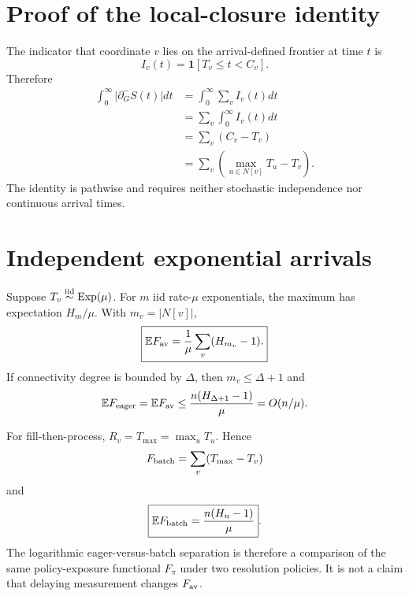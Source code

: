 \documentclass[aps,prx,preprint,superscriptaddress,nofootinbib,longbibliography]{revtex4-2}
\newcommand{\E}{\mathbb E}\newcommand{\Prob}{\mathbb P}\newcommand{\pw}{\operatorname{pw}}\newcommand{\tw}{\operatorname{tw}}
\begin{document}
\section{Proof of the local-closure identity}
The indicator that coordinate $v$ lies on the arrival-defined frontier at time $t$ is
\begin{equation}
I_v(t)=\mathbf 1[T_v\le t<C_v].
\end{equation}
Therefore
\begin{align}
\int_0^\infty|\partial_G^-S(t)|dt
&=\int_0^\infty\sum_v I_v(t)dt\\
&=\sum_v\int_0^\infty I_v(t)dt\\
&=\boxed{\sum_v(C_v-T_v)}\\
&=\boxed{\sum_v\left(\max_{u\in N[v]}T_u-T_v\right)}.
\end{align}
The identity is pathwise and requires neither stochastic independence nor continuous arrival times.

\section{Independent exponential arrivals}
Suppose $T_v\stackrel{\rm iid}{\sim}\mathrm{Exp}(\mu)$. For $m$ iid rate-$\mu$ exponentials, the maximum has expectation $H_m/\mu$. With $m_v=|N[v]|$,
\begin{equation}
\boxed{\E F_{\rm av}=\frac1\mu\sum_v(H_{m_v}-1).}
\end{equation}
If connectivity degree is bounded by $\Delta$, then $m_v\le\Delta+1$ and
\begin{equation}
\E F_{\rm eager}=\E F_{\rm av}\le\frac{n(H_{\Delta+1}-1)}{\mu}=O(n/\mu).
\end{equation}

For fill-then-process, $R_v=T_{\max}=\max_uT_u$. Hence
\begin{equation}
F_{\rm batch}=\sum_v(T_{\max}-T_v)
\end{equation}
and
\begin{equation}
\boxed{\E F_{\rm batch}=\frac{n(H_n-1)}{\mu}}.
\end{equation}
The logarithmic eager-versus-batch separation is therefore a comparison of the same policy-exposure functional $F_\pi$ under two resolution policies. It is not a claim that delaying measurement changes $F_{\rm av}$.
\end{document}
